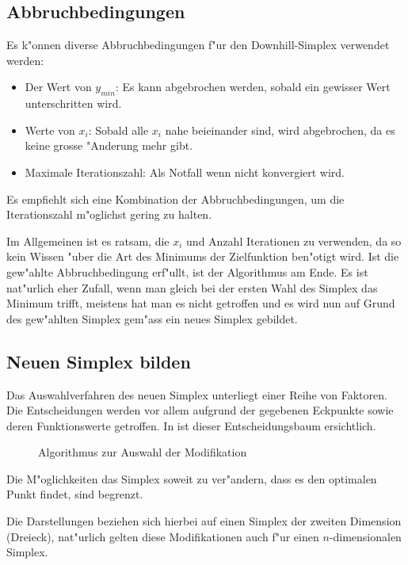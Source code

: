 \subsection{Abbruchbedingungen}
\label{sec:downhillAbbruch}
Es k"onnen diverse Abbruchbedingungen f"ur den Downhill-Simplex verwendet werden:
\begin{itemize}
\item Der Wert von $y_{min}$: Es kann abgebrochen werden, sobald ein gewisser Wert unterschritten wird.
\item Werte von $x_i$: Sobald alle $x_i$ nahe beieinander sind, wird abgebrochen, da es keine grosse "Anderung mehr gibt.
\item Maximale Iterationszahl: Als Notfall wenn nicht konvergiert wird.
\end{itemize}

Es empfiehlt sich eine Kombination der Abbruchbedingungen, um die
Iterationszahl m"oglichst gering zu halten.


Im Allgemeinen ist es ratsam, die $x_i$ und Anzahl Iterationen zu
verwenden, da so kein Wissen "uber die Art des Minimums der Zielfunktion
ben"otigt wird.
Ist die gew"ahlte Abbruchbedingung erf"ullt, ist der Algorithmus am Ende.
Es ist nat"urlich eher Zufall, wenn man gleich bei der ersten
Wahl des Simplex das Minimum trifft, meistens hat man es nicht
getroffen und es wird nun auf Grund des gew"ahlten Simplex gem"ass
 ein neues Simplex gebildet.

\subsection{Neuen Simplex bilden}
\label{sec:downhillModi}

Das Auswahlverfahren des neuen Simplex unterliegt einer Reihe von
Faktoren. Die Entscheidungen werden vor allem aufgrund der gegebenen
Eckpunkte sowie deren Funktionswerte getroffen.
In  ist dieser Entscheidungsbaum ersichtlich.

\begin{figure}[h]

\caption{Algorithmus zur Auswahl der Modifikation}
\label{fig:downhillalg2}
\end{figure}

Die M"oglichkeiten das Simplex soweit zu ver"andern, dass es den optimalen
Punkt findet, sind begrenzt.

Die Darstellungen beziehen sich hierbei auf einen Simplex der zweiten
Dimension (Dreieck), nat"urlich gelten diese Modifikationen auch f"ur
einen $n$-dimensionalen Simplex.

